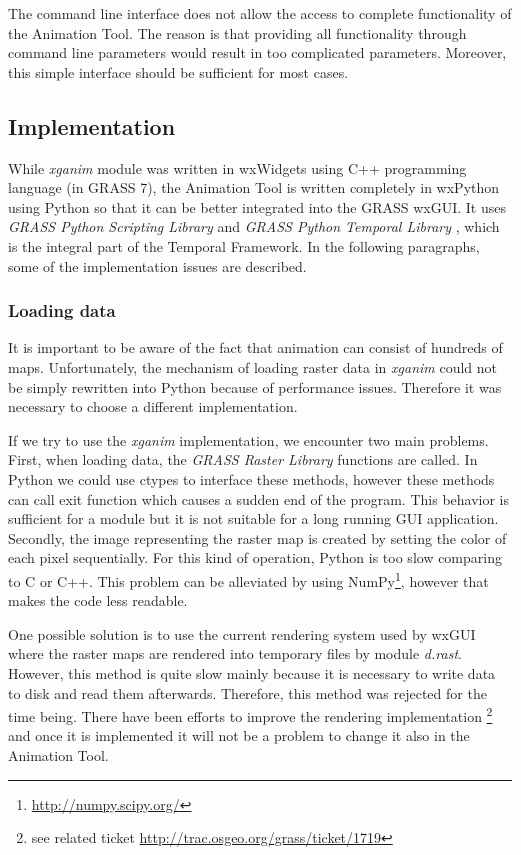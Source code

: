 \documentclass[a4paper,12pt,oneside]{book}
\newcommand{\module}[1]{\textsl{#1}}
\newcommand{\tf}{Temporal Framework\xspace}
\newcommand{\at}{Animation Tool\xspace}
\begin{document}
The command line interface does not allow the access to complete functionality of the \at.
The reason is that providing all functionality through command line parameters
would result in too complicated parameters.
Moreover, this simple interface should be sufficient for most cases.


\subsection{Implementation}
While \module{xganim} module was written in wxWidgets using C++ programming language (in GRASS 7),
the \at is written completely in wxPython using Python so that it can be better integrated into the GRASS wxGUI.
It uses \emph{GRASS Python Scripting Library} and \emph{GRASS Python Temporal Library} \cite{grassProgMan},
which is the integral part of the \tf. In the following paragraphs, some of the implementation issues are described.

\subsubsection{Loading data}
It is important to be aware of the fact that animation can consist of hundreds of maps.
Unfortunately, the mechanism of loading raster data in \module{xganim} could not be simply
rewritten into Python because of performance issues.
Therefore it was necessary to choose a different implementation.

If we try to use the \module{xganim} implementation, we encounter two main problems.
First, when loading data, the \emph{GRASS Raster Library} functions \cite{grassProgMan} are called.
In Python we could use ctypes to interface these methods,
however these methods can call exit function which causes a sudden end of the program.
This behavior is sufficient for a module but it is not suitable for a long running GUI application.
Secondly, the image representing the raster map is created by setting the color of each pixel sequentially.
For this kind of operation, Python is too slow comparing to C or C++.
This problem can be alleviated by using NumPy\footnote{\url{http://numpy.scipy.org/}},
however that makes the code less readable.

One possible solution is to use the current rendering system used by wxGUI
where the raster maps are rendered into temporary files by module \module{d.rast}.
However, this method is quite slow mainly because it is necessary to write data to disk and read them afterwards.
Therefore, this method was rejected for the time being.
There have been efforts to improve the rendering implementation%
\footnote{see related ticket \url{http://trac.osgeo.org/grass/ticket/1719}}
and once it is implemented it will not be a problem to change it also in the \at.
\end{document}
